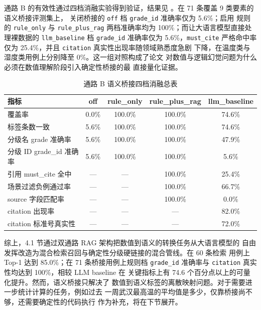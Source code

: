 通路 B 的有效性通过四档消融实验得到验证，结果见
。在 71 条覆盖 9 类要素的语义桥接评测集上，
关闭桥接的 \texttt{off} 档 \texttt{grade\_\bk{}id} 准确率仅为 5.6\%；启用
规则的 \texttt{rule\_\bk{}only} 与 \texttt{rule\_\bk{}plus\_\bk{}rag} 两档准确率均为
100\%；而让大语言模型直接处理裸数据的 \texttt{llm\_\bk{}baseline} 档
\texttt{grade\_\bk{}id} 准确率仅为 5.6\%，\texttt{must\_\bk{}cite} 严格命中率
仅为 25.4\%，并且 \texttt{citation} 真实性出现率随领域熟悉度急剧
下降，在温度类与湿度类用例上分别降至 0\%。这一组对照构成了论文
对数值与逻辑幻觉问题为什么必须在数值理解阶段引入确定性桥接的最
直接量化证据。

\begin{table}[!ht]
    \centering
    \caption{通路 B 语义桥接四档消融总表}
    \label{tab:bridge-ablation}
    \song\wuhao
    \begin{tabular}{lcccc}
        \toprule
        指标 & off & rule\_only & rule\_plus\_rag & llm\_baseline \\
        \midrule
        覆盖率 & 0.0\% & 100.0\% & 100.0\% & 74.6\% \\
        标签条数一致 & 5.6\% & 100.0\% & 100.0\% & 74.6\% \\
        分级名 grade 准确率 & 5.6\% & 100.0\% & 100.0\% & 47.9\% \\
        分级 ID grade\_id 准确率 & 5.6\% & 100.0\% & 100.0\% & 5.6\% \\
        引用 must\_cite 全中 & --- & --- & 100.0\% & 25.4\% \\
        场景过滤负例通过率 & --- & --- & 100.0\% & 66.7\% \\
        source 字段匹配率 & --- & --- & 100.0\% & 0.0\% \\
        citation 出现率 & --- & --- & --- & 82.0\% \\
        citation 标准号真实性 & --- & --- & --- & 72.0\% \\
        \bottomrule
    \end{tabular}
\end{table}

综上，4.1 节通过双通路 RAG 架构把数值到语义的转换任务从大语言模型的
自由发挥改造为混合检索召回与确定性分级硬链接的混合管线。在 60 条检索
用例上 Top-1 达到 85.0\%；在 71 条桥接用例上规则档 \texttt{grade\_\bk{}id}
准确率与 \texttt{citation} 真实性均达到 100\%，相较 LLM baseline 在
关键指标上有 74.6 个百分点以上的可量化提升。然而，语义桥接只解决了
数值到语义标签的离散映射问题。对于需要进一步统计计算的任务，例如过去
一周武汉最高温的平均值是多少，仅靠桥接尚不够，还需要确定性的代码执行
作为补充，将在下节展开。
